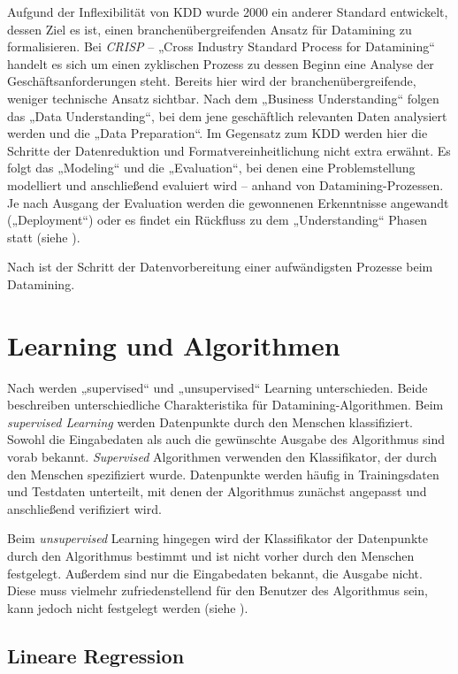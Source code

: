 Aufgund der Inflexibilität von KDD wurde 2000 ein anderer Standard entwickelt, dessen Ziel es ist, einen branchenübergreifenden Ansatz für Datamining zu formalisieren. Bei \textit{CRISP} -- „Cross Industry Standard Process for Datamining“\cite{crisp2000} handelt es sich um einen zyklischen Prozess zu dessen Beginn eine Analyse der Geschäftsanforderungen steht. Bereits hier wird der branchenübergreifende, weniger technische Ansatz sichtbar. Nach dem „Business Understanding“ folgen das „Data Understanding“, bei dem jene geschäftlich relevanten Daten analysiert werden und die „Data Preparation“. Im Gegensatz zum KDD werden hier die Schritte der Datenreduktion und Formatvereinheitlichung nicht extra erwähnt. Es folgt das „Modeling“ und die „Evaluation“, bei denen eine Problemstellung modelliert und anschließend evaluiert wird -- anhand von Datamining-Prozessen. Je nach Ausgang der Evaluation werden die gewonnenen Erkenntnisse angewandt („Deployment“) oder es findet ein Rückfluss zu dem „Understanding“ Phasen statt (siehe \cite{crisp2000}).

Nach \cite{pocket2014} ist der Schritt der Datenvorbereitung einer aufwändigsten Prozesse beim Datamining.

\section{Learning und Algorithmen}

Nach \cite{datamining2011} werden „supervised“ und „unsupervised“ Learning unterschieden. Beide beschreiben unterschiedliche Charakteristika für Datamining-Algorithmen. Beim \textit{supervised Learning} werden Datenpunkte durch den Menschen klassifiziert. Sowohl die Eingabedaten als auch die gewünschte Ausgabe des Algorithmus sind vorab bekannt. \textit{Supervised} Algorithmen verwenden den Klassifikator, der durch den Menschen spezifiziert wurde. Datenpunkte werden häufig in Trainingsdaten und Testdaten unterteilt, mit denen der Algorithmus zunächst angepasst und anschließend verifiziert wird.

Beim \textit{unsupervised} Learning hingegen wird der Klassifikator der Datenpunkte durch den Algorithmus bestimmt und ist nicht vorher durch den Menschen festgelegt. Außerdem sind nur die Eingabedaten bekannt, die Ausgabe nicht. Diese muss vielmehr zufriedenstellend für den Benutzer des Algorithmus sein, kann jedoch nicht festgelegt werden (siehe \cite{datamining2011}).

\subsection {Lineare Regression}

